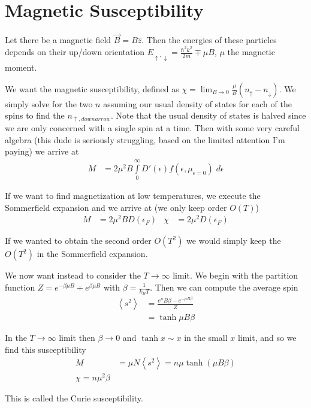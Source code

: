 \documentclass[10pt]{report}
\newcommand{\expvalue}[1]{\left<#1\right>}
\begin{document}
\section{Magnetic Susceptibility}

Let there be a magnetic field $\vec{B} = B\hat{z}$. Then the energies of these particles depends on their up/down orientation $E_{\uparrow, \downarrow} = \frac{\hbar^2 k^2}{2m} \mp \mu B$, $\mu$ the magnetic moment.

We want the magnetic susceptibility, defined as $\chi = \lim_{B \to 0}\frac{\mu}{B}\left( n_\uparrow - n_\downarrow \right)$. We simply solve for the two $n$ assuming our usual density of states for each of the spins to find the $n_{\uparrow, downarrow}$. Note that the usual density of states is halved since we are only concerned with a single spin at a time. Then with some very careful algebra (this dude is seriously struggling, based on the limited attention I'm paying) we arrive at
\begin{align}
    M &= 2\mu^2B \int\limits_{0}^{\infty}D'(\epsilon)f(\epsilon,\mu_{\epsilon = 0})\;d\epsilon
\end{align}

If we want to find magnetization at low temperatures, we execute the Sommerfield expansion and we arrive at (we only keep order $O(T)$)
\begin{align}
    M &= 2\mu^2 BD(\epsilon_F) & \chi &= 2\mu^2 D(\epsilon_F)
\end{align}

If we wanted to obtain the second order $O(T^2)$ we would simply keep the $O(T^2)$ in the Sommerfield expansion.

We now want instead to consider the $T \to \infty$ limit. We begin with the partition function $Z = e^{-\beta \mu B} + e^{\beta \mu B}$ with $\beta = \frac{1}{k_BT}$. Then we can compute the average spin 
\begin{align}
    \expvalue{s^2} &= \frac{e^\mu B\beta - e^{-\mu B\beta}}{Z}\\
    &= \tanh \mu B\beta
\end{align}

In the $T \to \infty$ limit then $\beta \to 0$ and $\tanh x \sim x$ in the small $x$ limit, and so we find this susceptibility
\begin{align}
    M &= \mu N\expvalue{s^2} = n\mu \tanh(\mu B\beta)\\
    \chi = n\mu^2 \beta
\end{align}

This is called the Curie susceptibility.
\end{document}
